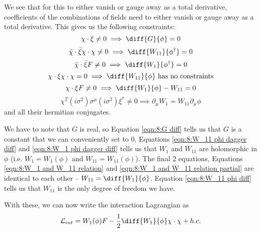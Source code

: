 We see that for this to either vanish or gauge away as a total derivative, coefficients of the combinations of fields need to either vanish or gauge away as a total derivative. This gives us the following constraints:
\begin{equation}
    \chi \cdot \xi \neq 0 \implies \diff{G}{\phi} = 0
    \label{eqn:8:G diff}
\end{equation}
\begin{equation}
    \Bar{\chi}\cdot\Bar{\xi} \chi\cdot\chi\neq 0 \implies \diff{W_{11}}{\phi^\dagger} = 0
    \label{eqn:8:W_11 phi dagger diff}
\end{equation}
\begin{equation}
    \Bar{\chi}\cdot\Bar{\xi} F \neq 0 \implies \diff{W_1}{\phi^\dagger} = 0
    \label{eqn:8:W_1 phi dagger diff}
\end{equation}
\begin{equation}
    \chi\cdot\xi\chi\cdot\chi = 0 \implies \diff{W_{11}}{\phi} \text{ has no constraints}
    \label{eqn:8:W_11 phi diff}
\end{equation}
\begin{equation}
    \chi \cdot \xi F \neq 0 \implies \diff{W_1}{\phi} - W_{11} = 0
    \label{eqn:8:W_1 and W_11 relation}
\end{equation}
\begin{equation}
    \chi^T (i \sigma^2) \sigma^\mu (i \sigma^2) \xi^* \neq 0 \implies \partial_\mu W_1 = W_{11} \partial_\mu \phi
    \label{eqn:8:W_1 and W_11 relation partial}
\end{equation}
and all their hermitian conjugates.

We have to note that $G$ is real, so Equation \ref{eqn:8:G diff} tells us that $G$ is a constant that we can conveniently set to 0. Equations \ref{eqn:8:W_11 phi dagger diff} and \ref{eqn:8:W_1 phi dagger diff} tells us that $W_{1}$ and $W_{11}$ are holomorphic in $\phi$ (i.e. $W_1 = W_1(\phi)$ and $W_{11} = W_{11}(\phi)$). The final 2 equations, Equations \ref{eqn:8:W_1 and W_11 relation} and \ref{eqn:8:W_1 and W_11 relation partial} are identical to each other -- $W_{11} = \diff{W_1}{\phi}$. Equation \ref{eqn:8:W_11 phi diff} tells us that $W_{11}$ is the only degree of freedom we have.

With these, we can now write the interaction Lagrangian as
\begin{equation}
    \mathcal{L}_{int} = W_1(\phi) F - \frac{1}{2} \diff{W_1}{\phi} \chi\cdot\chi + h.c.
\end{equation}


